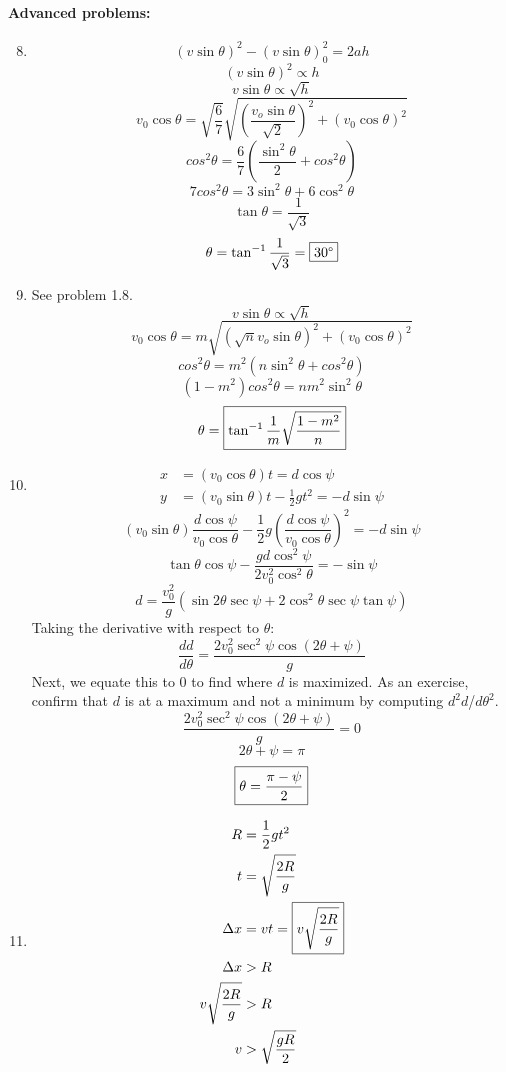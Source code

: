 \documentclass[12pt,letterpaper]{article}
\begin{document}
\begin{multicols}{2}
\paragraph{Advanced problems:}
\begin{enumerate}
\setcounter{enumi}{7}
\item
$$\left(v\sin \theta\right)^2-\left(v\sin \theta\right)_0^2=2ah$$
$$\left(v\sin \theta\right)^2\propto h$$
$$v\sin\theta\propto\sqrt{h}$$
$$v_0 \cos \theta = \sqrt{\frac{6}{7}}\sqrt{\left(\frac{v_o\sin\theta}{\sqrt{2}}\right)^2+\left(v_0\cos\theta\right)^2}$$
$$cos^2 \theta = \frac{6}{7}\left(\frac{\sin^2 \theta}{2}+cos^2 \theta\right)$$
$$7cos^2 \theta = 3\sin^2 \theta + 6\cos^2 \theta$$
$$\tan \theta = \frac{1}{\sqrt{3}}$$
$$\theta = \tan^{-1} \frac{1}{\sqrt{3}} = \fbox{30$\degree$}$$


\item See problem 1.8.
$$v\sin\theta\propto\sqrt{h}$$
$$v_0 \cos \theta = m\sqrt{\left(\sqrt{n}v_o\sin\theta\right)^2+\left(v_0\cos\theta\right)^2}$$
$$cos^2 \theta = m^2\left(n\sin^2 \theta+cos^2 \theta\right)$$
$$\left(1-m^2\right)cos^2 \theta = nm^2\sin^2 \theta$$
$$\theta = \fbox{$\displaystyle \tan^{-1} \frac{1}{m}\sqrt{\frac{1-m^2}{n}}$}$$

\item \[
\begin{aligned}
x &= \left(v_0\cos \theta\right)t = d\cos \psi\\
y &= \left(v_0\sin \theta\right)t-\frac{1}{2}gt^2 = -d\sin \psi
\end{aligned}
\]
$$\left(v_0\sin \theta\right)\frac{d\cos \psi}{v_0\cos \theta}-\frac{1}{2}g\left(\frac{d\cos \psi}{v_0\cos \theta}\right)^2 = -d\sin \psi$$
$$\tan \theta \cos \psi-\frac{gd\cos^2 \psi}{2v_0^2\cos^2 \theta} = -\sin \psi$$
$$d = \frac{v_0^2}{g}\left(\sin 2\theta \sec \psi+2\cos^2 \theta\sec \psi \tan \psi\right)$$
Taking the derivative with respect to $\theta$:
$$\frac{dd}{d\theta} = \frac{2 v_0^2 \sec^2 \psi \cos\left(2 \theta+\psi\right)}{g}$$
Next, we equate this to 0 to find where $d$ is maximized. As an exercise, confirm that $d$ is at a maximum and not a minimum by computing $d^2d$\slash $d\theta^2$.
$$\frac{2 v_0^2 \sec^2 \psi \cos\left(2 \theta+\psi\right)}{g} = 0$$
$$2 \theta+\psi = \pi$$
$$\fbox{$\displaystyle \theta = \frac{\pi-\psi}{2}$}$$


\item\[
\begin{aligned}
R &= \frac{1}{2}gt^2\\
t &= \sqrt{\frac{2R}{g}}\\
\Delta x &= vt = \fbox{$\displaystyle v \sqrt{\frac{2R}{g}}$}\\
\Delta x &> R\\
v \sqrt{\frac{2R}{g}} &> R\\
v &> \sqrt{\frac{gR}{2}}
\end{aligned}
\]
\end{enumerate}


\end{multicols}
\end{document}

